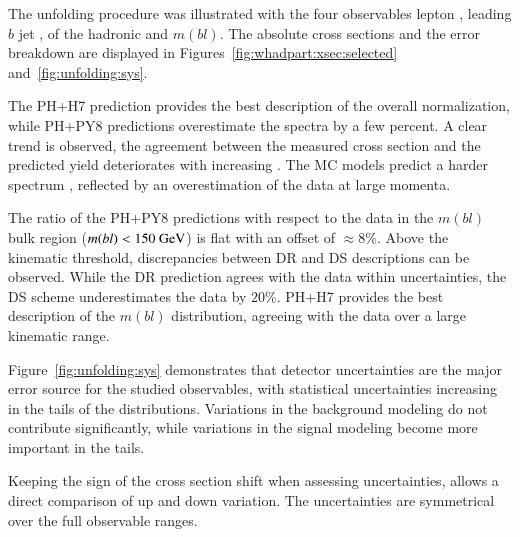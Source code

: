 The unfolding procedure was illustrated with the four observables lepton \pt, leading $b$ jet \pt, \pt of the hadronic \Wboson and $m(bl)$.
The absolute cross sections and the error breakdown are displayed in Figures~\ref{fig:whadpart:xsec:selected} and~\ref{fig:unfolding:sys}.

The PH+H7 prediction provides the best description of the overall normalization,
while PH+PY8 predictions overestimate the spectra by a few percent.
A clear trend is observed, the agreement between the measured cross section and the predicted yield deteriorates with increasing \pt.
The MC models predict a harder \pt spectrum , reflected by an overestimation of the data at large momenta.



The ratio of the PH+PY8 predictions with respect to the data in the $m(bl)$ bulk region ($m(bl)<150~\text{GeV}$) is flat with an offset of $\approx 8\%$.
Above the kinematic threshold, discrepancies between DR and DS descriptions can be observed. While the DR prediction agrees with the data within uncertainties, the DS scheme underestimates the data by $20\%$.
PH+H7 provides the best description of the $m(bl)$ distribution, agreeing with the data over a large kinematic range.

Figure~\ref{fig:unfolding:sys} demonstrates that detector uncertainties are the major error source for the studied observables, with statistical uncertainties increasing in the tails of the distributions. Variations in the background modeling do not contribute significantly, while variations in the signal modeling become more important in the tails.

Keeping the sign of the cross section shift when assessing uncertainties, allows a direct comparison of up and down variation.
The uncertainties are symmetrical over the full observable ranges.

